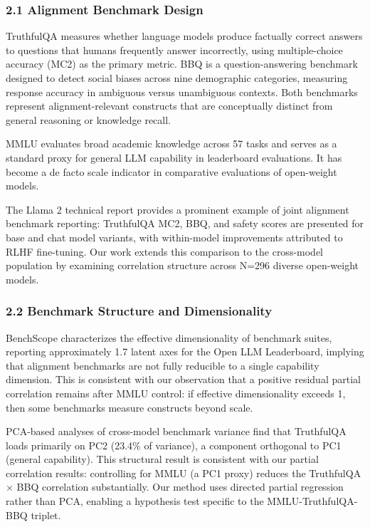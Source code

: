 
\subsubsection{2.1 Alignment Benchmark Design}

TruthfulQA \citep{Lin2022} measures whether language models produce factually correct answers to questions that humans frequently answer incorrectly, using multiple-choice accuracy (MC2) as the primary metric. BBQ \citep{Parrish2022} is a question-answering benchmark designed to detect social biases across nine demographic categories, measuring response accuracy in ambiguous versus unambiguous contexts. Both benchmarks represent alignment-relevant constructs that are conceptually distinct from general reasoning or knowledge recall.

MMLU \citep{Hendrycks2021} evaluates broad academic knowledge across 57 tasks and serves as a standard proxy for general LLM capability in leaderboard evaluations. It has become a de facto scale indicator in comparative evaluations of open-weight models.

The Llama 2 technical report \citep{Touvron2023} provides a prominent example of joint alignment benchmark reporting: TruthfulQA MC2, BBQ, and safety scores are presented for base and chat model variants, with within-model improvements attributed to RLHF fine-tuning. Our work extends this comparison to the cross-model population by examining correlation structure across N=296 diverse open-weight models.

\subsubsection{2.2 Benchmark Structure and Dimensionality}

BenchScope \citep{Sha2026} characterizes the effective dimensionality of benchmark suites, reporting approximately 1.7 latent axes for the Open LLM Leaderboard, implying that alignment benchmarks are not fully reducible to a single capability dimension. This is consistent with our observation that a positive residual partial correlation remains after MMLU control: if effective dimensionality exceeds 1, then some benchmarks measure constructs beyond scale.

PCA-based analyses of cross-model benchmark variance \citep{clawrxiv2603} find that TruthfulQA loads primarily on PC2 (23.4\% of variance), a component orthogonal to PC1 (general capability). This structural result is consistent with our partial correlation results: controlling for MMLU (a PC1 proxy) reduces the TruthfulQA $\times$ BBQ correlation substantially. Our method uses directed partial regression rather than PCA, enabling a hypothesis test specific to the MMLU-TruthfulQA-BBQ triplet.

